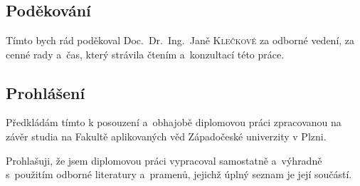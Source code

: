 \chapter*{}

\section*{Poděkování}\label{sec:poděkování}

Tímto bych rád poděkoval Doc.\ Dr.\ Ing.\ Janě \textsc{Klečkové} za odborné vedení, za cenné rady a~čas, který strávila čtením a~konzultací této práce.

\vspace{5cm}

\section*{Prohlášení}

Předkládám tímto k posouzení a~obhajobě diplomovou práci zpracovanou na závěr studia na Fakultě aplikovaných věd Západočeské univerzity v Plzni.\newline

Prohlašuji, že jsem diplomovou práci vypracoval samostatně a~výhradně s~použitím odborné literatury a~pramenů, jejichž úplný seznam je její součástí.

\vspace{3.5cm}

\noindent{}
